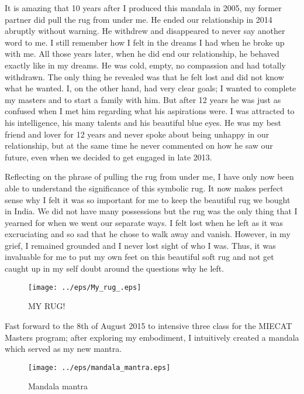 It is amazing that 10 years after I produced this mandala in 2005, my former partner did pull the rug from under me. He ended our relationship in 2014 abruptly without warning. He withdrew and disappeared to never say another word to me. I still remember how I felt in the dreams I had when he broke up with me. All those years later, when he did end our relationship, he behaved exactly like in my dreams. He was cold, empty, no compassion and had totally withdrawn. The only thing he revealed was that he felt lost and did not know what he wanted. I, on the other hand, had very clear goals; I wanted to complete my masters and to start a family with him. But after 12 years he was just as confused when I met him regarding what his aspirations were. I was attracted to his intelligence, his many talents and his beautiful blue eyes. He was my best friend and lover for 12 years and never spoke about being unhappy in our relationship, but at the same time he never commented on how he saw our future, even when we decided to get engaged in late 2013. 

Reflecting on the phrase of pulling the rug from under me, I have only now been able to understand the significance of this symbolic rug. It now makes perfect sense why I felt it was so important for me to keep the beautiful rug we bought in India. We did not have many possessions but the rug was the only thing that I yearned for when we went our separate ways. I felt lost when he left as it was excruciating and so sad that he chose to walk away and vanish. However, in my grief, I remained grounded and I never lost sight of who I was. Thus, it was invaluable for me to put my own feet on this beautiful soft rug and not get caught up in my self doubt around the questions why he left.


\begin{figure}[htbp]
\begin{center}
\texttt{[image: ../eps/My\_rug\_.eps]}
\caption{MY RUG!}
\label{label}
\end{center}
\end{figure}


Fast forward to the 8th of August 2015 to intensive three class for the MIECAT Masters program; after exploring my embodiment, I intuitively created a mandala which served as my new mantra. 

\begin{figure}[htbp]
\begin{center}
\texttt{[image: ../eps/mandala\_mantra.eps]}
\caption{Mandala mantra}
\label{label}
\end{center}
\end{figure}

